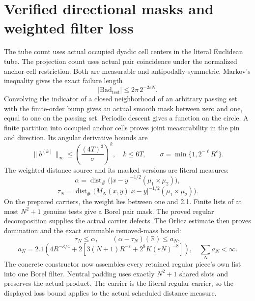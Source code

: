 \documentclass[11pt]{article}
\begin{document}
\section*{Verified directional masks and weighted filter loss}
The tube count uses actual occupied dyadic cell centers in the literal
Euclidean tube. The projection count uses actual pair coincidence under
the normalized anchor-cell restriction. Both are measurable and antipodally
symmetric. Markov's inequality gives the exact failure length
\[
|\mathrm{Bad}_{\mathrm{test}}|\le2\pi\,2^{-2\varepsilon N}.
\]
Convolving the indicator of a closed neighborhood of an arbitrary passing
set with the finite-order bump gives an actual smooth mask between zero and
one, equal to one on the passing set. Periodic descent gives a function on
 the circle. A finite partition into occupied anchor cells proves joint
measurability in the pin and direction. Its angular derivative bounds are
\[
\|b^{(k)}\|_\infty\le\left(\frac{(4T)^3}{\sigma}\right)^k,
\quad k\le6T,\qquad \sigma=\min\{1,2^{-\ell}R^\varepsilon\}.
\]
The weighted distance source and its masked versions are literal measures:
\[
\alpha=\operatorname{dist}_\#\bigl(|x-y|^{-1/2}(\mu_1\times\mu_2)\bigr),
\]
\[
\tau_N=\operatorname{dist}_\#\bigl(M_N(x,y)|x-y|^{-1/2}(\mu_1\times\mu_2)\bigr).
\]
On the prepared carriers, the weight lies between one and 2.1. Finite lists
of at most $N^2+1$ genuine tests give a Borel pair mask. The proved regular
 decomposition supplies the actual carrier defects. The Orlicz estimate then
proves domination and the exact summable removed-mass bound:
\[
\tau_N\le\alpha,\qquad (\alpha-\tau_N)(\mathbb R)\le a_N,
\]
\[
a_N=2.1\left(4R^{-\kappa/4}
+2\left[3(N+1)R^{-\varepsilon}+2^8K(\varepsilon N)^{-8}\right]\right),
\quad \sum_N a_N<\infty.
\]
The concrete constructor now assembles every retained regular piece's own
list into one Borel filter. Neutral padding uses exactly $N^2+1$ shared slots
and preserves the actual product. The carrier is the literal regular carrier,
so the displayed loss bound applies to the actual scheduled distance measure.

\newpage
\end{document}
